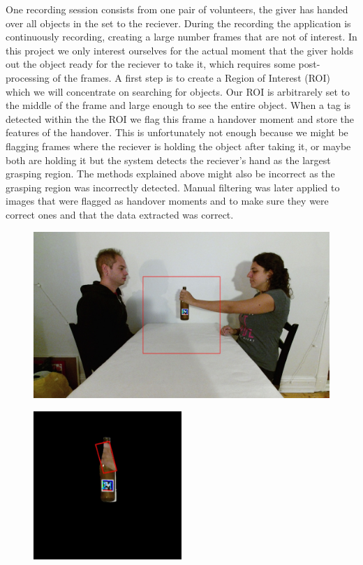 One recording session consists from one pair of volunteers, the giver has handed over all objects in the set to the reciever. During the recording the application is continuously recording, creating a large number frames that are not of interest. In this project we only interest ourselves for the actual moment that the giver holds out the object ready for the reciever to take it, which requires some post-processing of the frames. A first step is to create a Region of Interest (ROI) which we will concentrate on searching for objects. Our ROI is arbitrarely set to the middle of the frame and large enough to see the entire object. When a tag is detected within the the ROI we flag this frame a handover moment and store the features of the handover. This is unfortunately not enough because we might be flagging frames where the reciever is holding the object after taking it, or maybe both are holding it but the system detects the reciever's hand as the largest grasping region. The methods explained above might also be incorrect as the grasping region was incorrectly detected. Manual filtering was later applied to images that were flagged as handover moments and to make sure they were correct ones and that the data extracted was correct.

\begin{figure}
	\centering
	\includegraphics[width=\textwidth]{img/methods/handovers/bottle_frame.jpg}
	\caption{}
	\label{fig:handover_bottle}
\end{figure}

\begin{figure}
	\centering
	\includegraphics[width=0.5\textwidth]{img/methods/handovers/bottle_masked.jpg}
	\caption{}
	\label{fig:handover_bottle_masked}
\end{figure}

